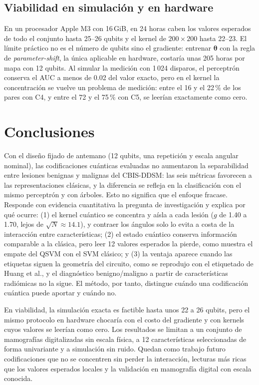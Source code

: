 \documentclass[conference,letterpaper]{IEEEtran}
\begin{document}
\subsection{Viabilidad en simulación y en hardware}

En un procesador Apple M3 con 16\,GiB, en 24 horas caben los valores esperados de todo el conjunto hasta 25--26 qubits y el kernel de $200 \times 200$ hasta 22--23. El límite práctico no es el número de qubits sino el gradiente: entrenar $\boldsymbol{\theta}$ con la regla de \textit{parameter-shift}, la única aplicable en hardware, costaría unas 205 horas por mapa con 12 qubits. Al simular la medición con 1\,024 disparos, el perceptrón conserva el AUC a menos de 0.02 del valor exacto, pero en el kernel la concentración se vuelve un problema de medición: entre el 16 y el 22\,\% de los pares con C4, y entre el 72 y el 75\,\% con C5, se leerían exactamente como cero.

\section{Conclusiones}

Con el diseño fijado de antemano (12 qubits, una repetición y escala angular nominal), las codificaciones cuánticas evaluadas no aumentaron la separabilidad entre lesiones benignas y malignas del CBIS-DDSM: las seis métricas favorecen a las representaciones clásicas, y la diferencia se refleja en la clasificación con el mismo perceptrón y con árboles. Esto no significa que el enfoque fracase. Responde con evidencia cuantitativa la pregunta de investigación y explica por qué ocurre: (1) el kernel cuántico se concentra y aísla a cada lesión ($g$ de 1.40 a 1.70, lejos de $\sqrt{N} \approx 14.1$), y contraer los ángulos solo lo evita a costa de la interacción entre características; (2) el estado cuántico conserva información comparable a la clásica, pero leer 12 valores esperados la pierde, como muestra el empate del QSVM con el SVM clásico; y (3) la ventaja aparece cuando las etiquetas siguen la geometría del circuito, como se reprodujo con el etiquetado de Huang et al., y el diagnóstico benigno/maligno a partir de características radiómicas no la sigue. El método, por tanto, distingue cuándo una codificación cuántica puede aportar y cuándo no.

En viabilidad, la simulación exacta es factible hasta unos 22 a 26 qubits, pero el mismo protocolo en hardware chocaría con el costo del gradiente y con kernels cuyos valores se leerían como cero. Los resultados se limitan a un conjunto de mamografías digitalizadas sin escala física, a 12 características seleccionadas de forma univariante y a simulación sin ruido. Quedan como trabajo futuro codificaciones que no se concentren sin perder la interacción, lecturas más ricas que los valores esperados locales y la validación en mamografía digital con escala conocida.
\end{document}
